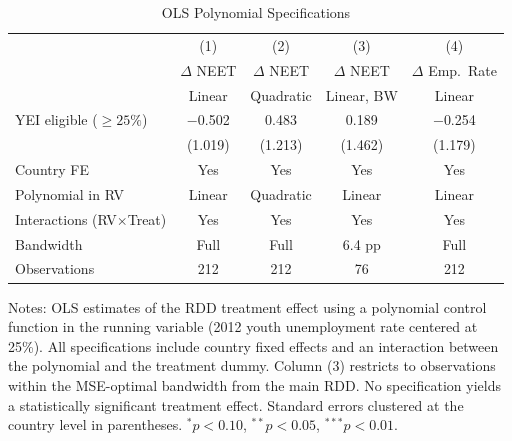 \begin{table}[h!]
\centering
\caption{OLS Polynomial Specifications}
\label{tab:ols}
\begin{tabular}{lcccc}
\toprule
 & (1) & (2) & (3) & (4) \\
 & $\Delta$ NEET & $\Delta$ NEET & $\Delta$ NEET & $\Delta$ Emp.~Rate \\
 & Linear & Quadratic & Linear, BW & Linear \\
\midrule
YEI eligible ($\geq 25\%$) & $-$0.502 & 0.483 & 0.189 & $-$0.254 \\
 & (1.019) & (1.213) & (1.462) & (1.179) \\
\midrule
Country FE & Yes & Yes & Yes & Yes \\
Polynomial in RV & Linear & Quadratic & Linear & Linear \\
Interactions (RV$\times$Treat) & Yes & Yes & Yes & Yes \\
Bandwidth & Full & Full & 6.4 pp & Full \\
Observations & 212 & 212 & 76 & 212 \\
\bottomrule
\end{tabular}

\raggedright\footnotesize
Notes: OLS estimates of the RDD treatment effect using a polynomial control function in the running variable (2012 youth unemployment rate centered at 25\%). All specifications include country fixed effects and an interaction between the polynomial and the treatment dummy. Column (3) restricts to observations within the MSE-optimal bandwidth from the main RDD. No specification yields a statistically significant treatment effect. Standard errors clustered at the country level in parentheses. $^{*}p<0.10$, $^{**}p<0.05$, $^{***}p<0.01$.
\end{table}

